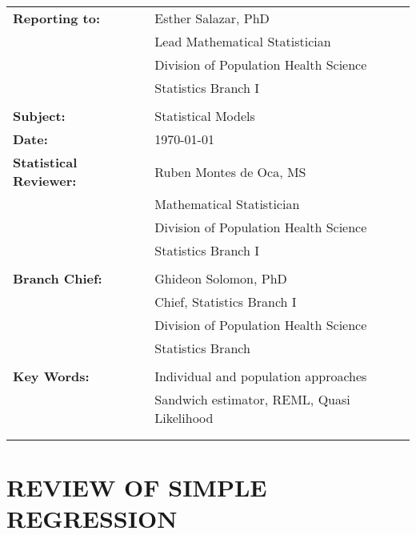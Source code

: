\documentclass[letterpaper,11pt]{article}
\begin{document}
\begin{tabular}[h!]{p{2in} p{10in}}
	\rule{0pt}{4ex}\textbf{Reporting to:}          & Esther Salazar, PhD  \\
																							   & Lead Mathematical Statistician \\
																							   & Division of Population Health Science \\
                                                 & Statistics Branch I\\
																							   & \\
	\rule{0pt}{4ex}\textbf{Subject:}               & Statistical Models \\
	\rule{0pt}{4ex}\textbf{Date:}                  & \today \\
	\rule{0pt}{4ex}\textbf{Statistical Reviewer:}  & Ruben Montes de Oca, MS \\
																							   & Mathematical Statistician \\
																							   & Division of Population Health Science \\
                                                 & Statistics Branch I\\
																							   & \\
	\rule{0pt}{4ex}\textbf{Branch Chief:}          & Ghideon Solomon, PhD \\
																							   & Chief, Statistics Branch I\\
																							   & Division of Population Health Science \\
                                                 & Statistics Branch \\
                                                 & \\
	\rule{0pt}{4ex}\textbf{Key Words:}  					 & Individual and population approaches\\
																								 & Sandwich estimator, REML, Quasi Likelihood \\
 \mbox{$\quad$} \\
 \mbox{$\quad$} \\
\end{tabular}

\newpage
\noindent 


\section*{REVIEW OF SIMPLE REGRESSION}
\end{document}

